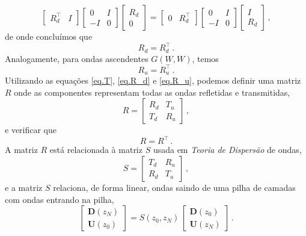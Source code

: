\begin{equation*}
\begin{bmatrix}
R_d^\top&I
\end{bmatrix}
\begin{bmatrix}
0&I\\
-I&0
\end{bmatrix}
\begin{bmatrix}
R_d\\
0
\end{bmatrix}
=
\begin{bmatrix}
0&R_d^\top
\end{bmatrix}
\begin{bmatrix}
0&I\\
-I&0
\end{bmatrix}
\begin{bmatrix}
I\\
R_d
\end{bmatrix}\,,
\end{equation*}
de onde conclu\'imos que 
\begin{equation}\label{eq.R_d}
R_d=R_d^\top\,.
\end{equation}
Analogamente, para ondas ascendentes $G(W,W)$, temos \begin{equation}\label{eq.R_u}
R_u=R_u^\top\,.
\end{equation}
Utilizando as equa\c{c}\~oes \ref{eq.T}, \ref{eq.R_d} e \ref{eq.R_u}, podemos definir uma matriz $R$ onde as componentes representam todas as ondas refletidas e transmitidas,
\begin{equation*}
R=
\begin{bmatrix}
R_d&T_u\\
T_d&R_u
\end{bmatrix}\,,
\end{equation*}
e verificar que 
\begin{equation*}
R=R^\top\,.
\end{equation*}
A matriz $R$ est\'a relacionada \`a matriz $S$ usada em \textit{Teoria de Dispers\~ao} de ondas,
\begin{equation*}
S=
\begin{bmatrix}
T_d&R_u\\
R_d&T_u
\end{bmatrix}\,,
\end{equation*}
e a matriz $S$ relaciona, de forma linear, ondas saindo de uma pilha de camadas com ondas entrando na pilha,
\begin{equation*}
\begin{bmatrix}
\mathbf{D}(z_N)\\
\mathbf{U}(z_0)
\end{bmatrix}
=
S(z_0,z_N)\,
\begin{bmatrix}
\mathbf{D}(z_0)\\
\mathbf{U}(z_N)
\end{bmatrix}\,.
\end{equation*} 

